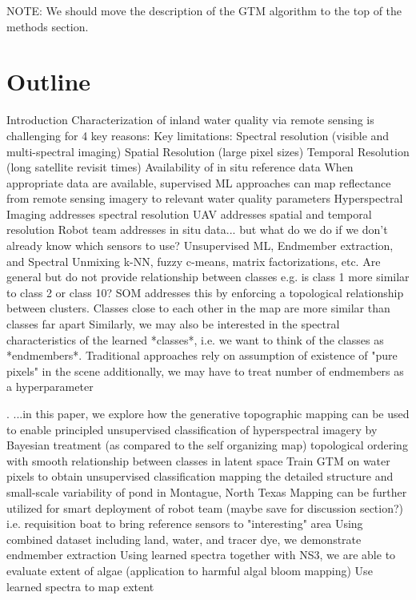 \documentclass{article}
\begin{document}
NOTE: We should move the description of the GTM algorithm to the top of the methods section.

\section*{Outline}

\begin{outline}[enumerate]

\1 Introduction
    \2 Characterization of inland water quality via remote sensing is challenging for 4 key reasons:
        \3 Key limitations:
            \4 Spectral resolution (visible and multi-spectral imaging)
            \4 Spatial Resolution (large pixel sizes)
            \4 Temporal Resolution (long satellite revisit times)
            \4 Availability of in situ reference data
        \3 When appropriate data are available, supervised ML approaches can map reflectance from remote sensing imagery to relevant water quality parameters
    \2 Hyperspectral Imaging addresses spectral resolution
    \2 UAV addresses spatial and temporal resolution
    \2 Robot team addresses in situ data... but what do we do if we don't already know which sensors to use? 
    \2 Unsupervised ML, Endmember extraction, and Spectral Unmixing
        \3 k-NN, fuzzy c-means, matrix factorizations, etc.
            \4 Are general but do not provide relationship between classes e.g. is class 1 more similar to class 2 or class 10?
        \3 SOM addresses this by enforcing a topological relationship between clusters. Classes close to each other in the map are more similar than classes far apart
        \3 Similarly, we may also be interested in the spectral characteristics of the learned *classes*, i.e. we want to think of the classes as *endmembers*.
            \4 Traditional approaches rely on assumption of existence of "pure pixels" in the scene
            \4 additionally, we may have to treat number of endmembers as a hyperparameter

    \2. ...in this paper, we explore how the generative topographic mapping can be used to
        \3 enable principled unsupervised classification of hyperspectral imagery by
            \4 Bayesian treatment (as compared to the self organizing map)
            \4 topological ordering with smooth relationship between classes in latent space
        \3 Train GTM on water pixels to obtain unsupervised classification mapping the detailed structure and small-scale variability of pond in Montague, North Texas
        \3 Mapping can be further utilized for smart deployment of robot team (maybe save for discussion section?) i.e. requisition boat to bring reference sensors to "interesting" area
        \3 Using combined dataset including land, water, and tracer dye, we demonstrate endmember extraction
        \3 Using learned spectra together with NS3, we are able to evaluate extent of algae (application to harmful algal bloom mapping)
        \3 Use learned spectra to map extent



\end{outline}
\end{document}
